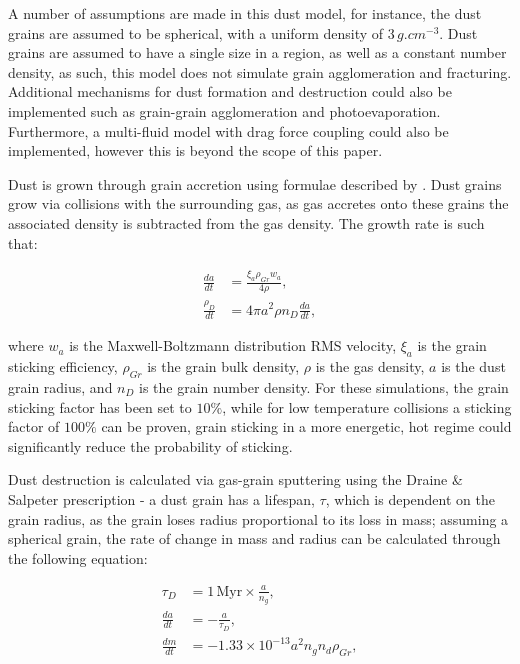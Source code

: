 A number of assumptions are made in this dust model, for instance, the dust grains are assumed to be spherical, with a uniform density of $3 \, \si{g.cm^{-3}}$. Dust grains are assumed to have a single size in a region, as well as a constant number density, as such, this model does not simulate grain agglomeration and fracturing.
Additional mechanisms for dust formation and destruction could also be implemented such as grain-grain agglomeration and photoevaporation.
Furthermore, a multi-fluid model with drag force coupling could also be implemented, however this is beyond the scope of this paper.

Dust is grown through grain accretion using formulae described by \parencite{spitzer_jr._physical_2008}. Dust grains grow via collisions with the surrounding gas, as gas accretes onto these grains the associated density is subtracted from the gas density. The growth rate is such that:


\begin{subequations}
  \begin{align}
        \frac{da}{dt} & = \frac{\xi_a \rho_{Gr} w_a}{4 \rho} , \\
    \frac{\rho_D}{dt} & = 4 \pi a^2 \rho n_D \frac{da}{dt}   , 
  \end{align}
\end{subequations}

where $w_a$ is the Maxwell-Boltzmann distribution RMS velocity, $\xi_a$ is the grain sticking efficiency, $\rho_{Gr}$ is the grain bulk density, $\rho$ is the gas density, $a$ is the dust grain radius, and $n_D$ is the grain number density. For these simulations, the grain sticking factor has been set to $10\%$, while for low temperature collisions a sticking factor of $100\%$ can be proven, grain sticking in a more energetic, hot regime could significantly reduce the probability of sticking. 

Dust destruction is calculated via gas-grain sputtering using the Draine \& Salpeter prescription - a dust grain has a lifespan, $\tau$, which is dependent on the grain radius, as the grain loses radius proportional to its loss in mass; assuming a spherical grain, the rate of change in mass and radius can be calculated through the following equation:

\begin{subequations}
  \begin{align}
           \tau_D & = 1 \, \text{Myr} \times \frac{a}{n_g} , \\
    \frac{da}{dt} & = - \frac{a}{\tau_D} , \\
    \frac{dm}{dt} & = -1.33 \times 10^{-13} a^2 n_g n_d \rho_{Gr} ,
  \end{align}
\end{subequations}

